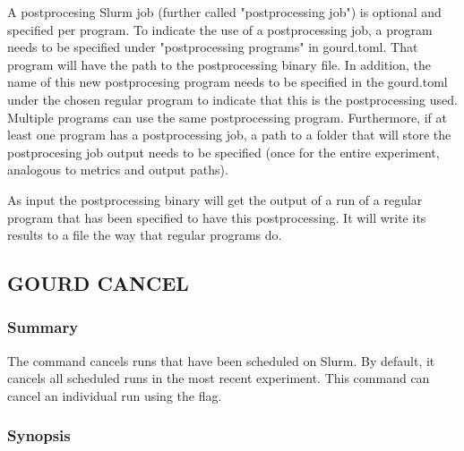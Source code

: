 \documentclass[a4paper,english]{article}
\begin{document}
\begin{adjustwidth}{18pt}{0pt}
                A postprocesing Slurm job (further called "postprocessing job") is optional and specified per
                program. To indicate the use of a postprocessing job, a program needs to be specified under
                "postprocessing programs" in gourd.toml. That program will have the path to the postprocessing
                binary file. In addition, the name of this new postprocesing program needs to be specified in
                the gourd.toml under the chosen regular program to indicate that this is the postprocessing
                used. Multiple programs can use the same postprocessing program. Furthermore, if at least one
                program has a postprocessing job, a path to a folder that will store the postprocesing job
                output needs to be specified (once for the entire experiment, analogous to metrics and output
                paths).

                As input the postprocessing binary will get the output of a run of a regular program that has
                been specified to have this postprocessing. It will write its results to a file the way that
                regular programs do.

        \subsection{GOURD CANCEL}

            \subsubsection{Summary}
                The   command cancels runs that have been scheduled on Slurm.
                By default, it cancels all scheduled runs in the most recent experiment.
                This command can cancel an individual run using the  flag.

            \subsubsection{Synopsis}
                 


\end{adjustwidth}
\end{document}

